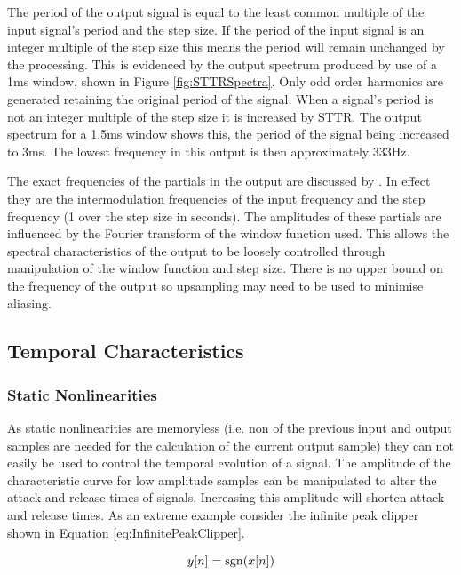 			The period of the output signal is equal to the least common multiple of the input signal's period
			and the step size. If the period of the input signal is an integer multiple of the step size this
			means the period will remain unchanged by the processing. This is evidenced by the output spectrum
			produced by use of a 1ms window, shown in Figure \ref{fig:STTRSpectra}. Only odd order harmonics
			are generated retaining the original period of the signal. When a signal's period is not an integer
			multiple of the step size it is increased by STTR. The output spectrum for a 1.5ms window shows
			this, the period of the signal being increased to 3ms. The lowest frequency in this output is then
			approximately 333Hz.

			The exact frequencies of the partials in the output are discussed by \citet{kim2014shorttime}. In
			effect they are the intermodulation frequencies of the input frequency and the step frequency (1
			over the step size in seconds). The amplitudes of these partials are influenced by the Fourier
			transform of the window function used. This allows the spectral characteristics of the output to be
			loosely controlled through manipulation of the window function and step size. There is no upper
			bound on the frequency of the output so upsampling may need to be used to minimise aliasing.

	\subsection{Temporal Characteristics}
	\label{sec:ExcitationEvaluation-Comparison-TemporalCharacteristics}
		\subsubsection*{Static Nonlinearities}
			As static nonlinearities are memoryless (i.e. non of the previous input and output samples are
			needed for the calculation of the current output sample) they can not easily be used to control the
			temporal evolution of a signal. The amplitude of the characteristic curve for low amplitude samples
			can be manipulated to alter the attack and release times of signals. Increasing this amplitude will
			shorten attack and release times. As an extreme example consider the infinite peak clipper shown in
			Equation \ref{eq:InfinitePeakClipper}.

			\begin{equation}
				y[n] = \operatorname{sgn}(x[n])
				\label{eq:InfinitePeakClipper}
			\end{equation}
			
